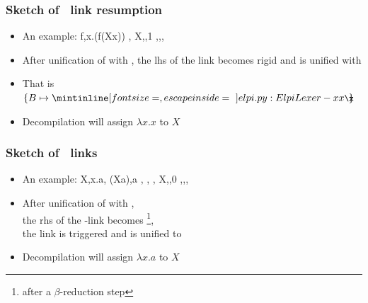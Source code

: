 \documentclass{pres}
\begin{document}
\begin{frame}[fragile]
  \frametitle{Sketch of \maybeeta\ link resumption}

  \begin{itemize}
    \item An example: %
      \printAlllSingle
        {{{f,\lambda x.(f\appsep (X\appsep x))}}}
        {{{,}}}
        {{{X,,1}}}
        {{{\eta,,,}}}
    \item After unification of  with ,
          the lhs of the link becomes rigid and
           is unified with 
    \item That is $\{B \mapsto \elpiIn{x\x}\!\!\!\}$
    \item Decompilation will assign $\lambda x.x$ to $X$
    \end{itemize}

\end{frame}

\begin{frame}[fragile]
  \frametitle{Sketch of \maybelam\ links}

  \begin{itemize}
    \item An example: 
      \printAlll
      {{{X,\lambda x.a},
        {(X\appsep a),a}}}
      {{{, },
        {,}}}
      {{{X,,0}}}
      {{{\llambda,,,}}}
    \item After unification of  with , \\
        the rhs of the \llambda-link becomes \footnote{after a $\beta$-reduction step},\\
        the link is triggered and  is unified to 
    \item Decompilation will assign $\lambda x.a$ to $X$
  \end{itemize}

\end{frame}
\end{document}

